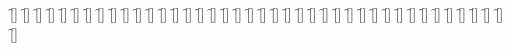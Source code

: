 \begin{questions}
\begin{multicols}{2}
        \question  \f[]
        \question  \f[]
        \question  \f[]
        \question  \f[]
        \question  \f[]
        \question  \f[]
        \question  \f[]
        \question  \f[]
        \question  \f[]
        \question  \f[]
        \question  \f[]
        \question  \f[]
        \question  \f[]
        \question  \f[]
        \question  \f[]
        \question  \f[]
        \question  \f[]
        \question  \f[]
        \question  \f[]
        \question  \f[]
        \question  \f[]
        \question  \f[]
        \question  \f[]
        \question  \f[]
        \question  \f[]
        \question  \f[]
        \question  \f[]
        \question  \f[]
        \question  \f[]
        \question  \f[]
        \question  \f[]
        \question  \f[]
        \question  \f[]
        \question  \f[]
        \question  \f[]
        \question  \f[]
        \question  \f[]
        \question  \f[]
        \question  \f[]
        \question  \f[]
        \question  \f[]
    \end{multicols}
\end{questions}
